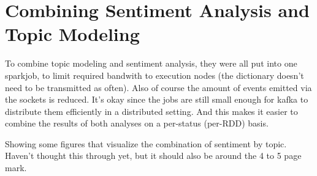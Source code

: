 \chapter{Combining Sentiment Analysis and Topic Modeling}
\label{ch:combiningSentimentAnalysisAndTopicModeling}

To combine topic modeling and sentiment analysis, they were all put into one sparkjob, to limit required bandwith to execution nodes (the dictionary doesn't need to be transmitted as often).
Also of course the amount of events emitted via the sockets is reduced.
It's okay since the jobs are still small enough for kafka to distribute them efficiently in a distributed setting.
And this makes it easier to combine the results of both analyses on a per-status (per-RDD) basis.

Showing some figures that visualize the combination of sentiment by topic.
Haven't thought this through yet, but it should also be around the 4 to 5 page mark.

\pagebreak[5]
